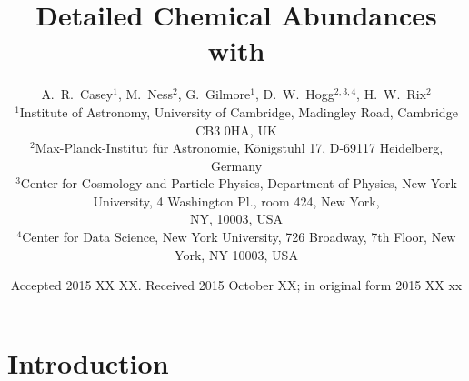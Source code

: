 \documentclass[useAMS,usenatbib]{mn2e}
\title[Cannon Chemistry]{Detailed Chemical Abundances with \tc}
\author[Casey et al.]{A.~R.~Casey$^1$, M.~Ness$^2$, G.~Gilmore$^1$,
    D.~W.~Hogg$^{2,3,4}$, H.~W.~Rix$^2$ \\ 
$^1$Institute of Astronomy, University of Cambridge, Madingley Road, Cambridge
    CB3 0HA, UK\\
$^2$Max-Planck-Institut f\"ur Astronomie, K\"onigstuhl 17, D-69117 Heidelberg,
    Germany\\
$^3$Center for Cosmology and Particle Physics, Department of Physics, New York
    University, 4 Washington Pl., room 424, New York, \\
    NY, 10003, USA\\
$^4$Center for Data Science, New York University, 726 Broadway, 7th Floor,
    New York, NY 10003, USA}
\begin{document}
\date{Accepted 2015 XX XX. Received 2015 October XX; in original form 2015 XX xx}

\pagerange{\pageref{firstpage}--\pageref{lastpage}} 

\maketitle

\label{firstpage}

\begin{abstract}


\end{abstract}

\begin{keywords}
\end{keywords}

\section{Introduction}

\end{document}

